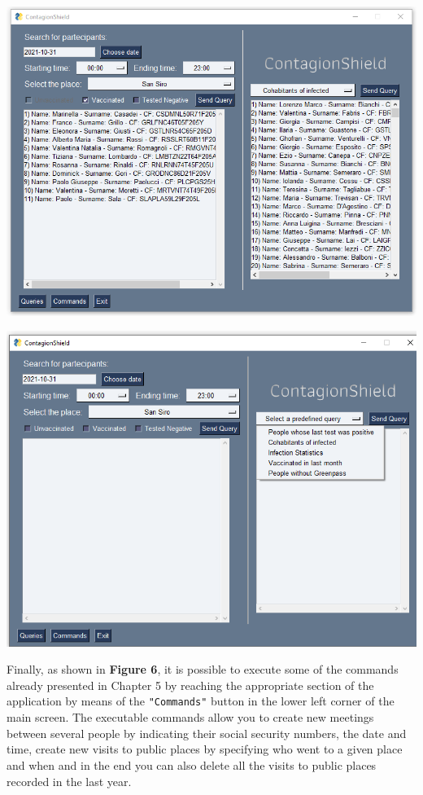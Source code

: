\documentclass[a4paper,12pt]{article}
\begin{document}
	\begin{center}
 		\includegraphics[width = 11 cm]{queriesresult.PNG}
	\end{center}
	\begin{center}
 		\includegraphics[width = 11 cm]{queriesexpanded.png}
	\end{center}
\pagebreak
Finally, as shown in \textbf{Figure 6}, it is possible to execute some of the commands already presented in Chapter 5 by reaching the appropriate section of the application by means of the \texttt{"Commands"} button in the lower left corner of the main screen. The executable commands allow you to create new meetings between several people by indicating their social security numbers, the date and time, create new visits to public places by specifying who went to a given place and when and in the end you can also delete all the visits to public places recorded in the last year. \par
\end{document}
